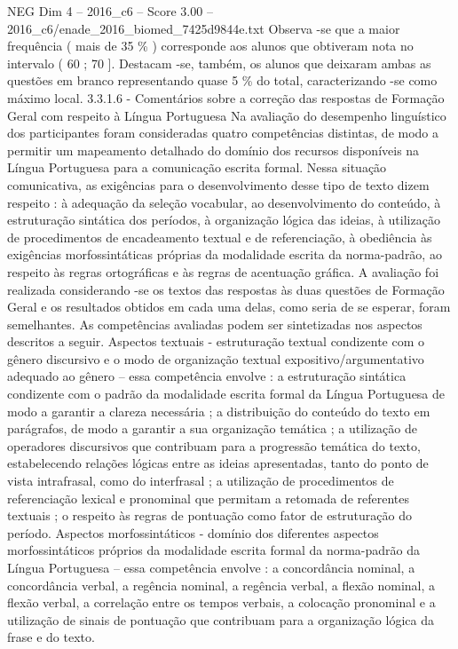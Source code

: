 \begin{textsample}{NEG Dim 4 – 2016\_c6 – Score 3.00 – 2016\_c6/enade\_2016\_biomed\_7425d9844e.txt}
Observa -se que a maior frequência ( mais de 35 \% ) corresponde aos alunos que obtiveram nota no intervalo ( 60 ; 70 ].
Destacam -se, também, os alunos que deixaram ambas as questões em branco representando quase 5 \% do total, caracterizando -se como máximo local. 3.3.1.6 - Comentários sobre a correção das respostas de Formação Geral com respeito à Língua Portuguesa Na avaliação do desempenho linguístico dos participantes foram consideradas quatro competências distintas, de modo a permitir um mapeamento detalhado do domínio dos recursos disponíveis na Língua Portuguesa para a comunicação escrita formal.
Nessa situação comunicativa, as exigências para o desenvolvimento desse tipo de texto dizem respeito : à adequação da seleção vocabular, ao desenvolvimento do conteúdo, à estruturação sintática dos períodos, à organização lógica das ideias, à utilização de procedimentos de encadeamento textual e de referenciação, à obediência às exigências morfossintáticas próprias da modalidade escrita da norma-padrão, ao respeito às regras ortográficas e às regras de acentuação gráfica.
A avaliação foi realizada considerando -se os textos das respostas às duas questões de Formação Geral e os resultados obtidos em cada uma delas, como seria de se esperar, foram semelhantes.
As competências avaliadas podem ser sintetizadas nos aspectos descritos a seguir.
Aspectos textuais - estruturação textual condizente com o gênero discursivo e o modo de organização textual expositivo/argumentativo adequado ao gênero – essa competência envolve : a estruturação sintática condizente com o padrão da modalidade escrita formal da Língua Portuguesa de modo a garantir a clareza necessária ; a distribuição do conteúdo do texto em parágrafos, de modo a garantir a sua organização temática ; a utilização de operadores discursivos que contribuam para a progressão temática do texto, estabelecendo relações lógicas entre as ideias apresentadas, tanto do ponto de vista intrafrasal, como do interfrasal ; a utilização de procedimentos de referenciação lexical e pronominal que permitam a retomada de referentes textuais ; o respeito às regras de pontuação como fator de estruturação do período.
Aspectos morfossintáticos - domínio dos diferentes aspectos morfossintáticos próprios da modalidade escrita formal da norma-padrão da Língua Portuguesa – essa competência envolve : a concordância nominal, a concordância verbal, a regência nominal, a regência verbal, a flexão nominal, a flexão verbal, a correlação entre os tempos verbais, a colocação pronominal e a utilização de sinais de pontuação que contribuam para a organização lógica da frase e do texto.

\end{textsample}
